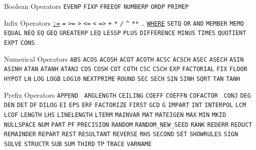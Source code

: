 \begin{list}{}
\item[Boolean Operators] {\texttt{EVENP}} {\texttt{FIXP}}
{\texttt{FREEOF}} {\texttt{NUMBERP}} {\texttt{ORDP}} {\texttt{PRIMEP}}

\item[Infix Operators]
\hyperlink{reserved:assignop}{\texttt{:=}} \verb|=| \verb|>=| \verb|>| \verb|<=| \verb|<| \verb|=>|
 \verb|+| \verb|*| \verb|/| \verb|^| \verb|**| \verb|.| 
\hyperlink{WHERE}{\texttt{WHERE}}
{\texttt{SETQ}} {\texttt{OR}} {\texttt{AND}} {\texttt{MEMBER}} {\texttt{MEMQ}} {\texttt{EQUAL}} {\texttt{NEQ}} {\texttt{EQ}} {\texttt{GEQ}} {\texttt{GREATERP}} {\texttt{LEQ}} {\texttt{LESSP}}
{\texttt{PLUS}} {\texttt{DIFFERENCE}} {\texttt{MINUS}} {\texttt{TIMES}} {\texttt{QUOTIENT}} {\texttt{EXPT}} {\texttt{CONS}}

\item[Numerical Operators] {\texttt{ABS}} {\texttt{ACOS}}
{\texttt{ACOSH}} {\texttt{ACOT}} {\texttt{ACOTH}} {\texttt{ACSC}} {\texttt{ACSCH}} {\texttt{ASEC}} {\texttt{ASECH}} {\texttt{ASIN}} {\texttt{ASINH}} {\texttt{ATAN}} {\texttt{ATANH}} {\texttt{ATAN2}} {\texttt{COS}}
{\texttt{COSH}} {\texttt{COT}} {\texttt{COTH}} {\texttt{CSC}} {\texttt{CSCH}} {\texttt{EXP}} {\texttt{FACTORIAL}} {\texttt{FIX}} {\texttt{FLOOR}} {\texttt{HYPOT}} {\texttt{LN}} {\texttt{LOG}} {\texttt{LOGB}}
{\texttt{LOG10}} {\texttt{NEXTPRIME}} {\texttt{ROUND}} {\texttt{SEC}} {\texttt{SECH}} {\texttt{SIN}}
{\texttt{SINH}} {\texttt{SQRT}} {\texttt{TAN}} {\texttt{TANH}}

\item[Prefix Operators] {\texttt{APPEND}} {\tt
ARGLENGTH} {\texttt{CEILING}} {\texttt{COEFF}} {\texttt{COEFFN}} {\texttt{COFACTOR}} {\tt
CONJ} {\texttt{DEG}} {\texttt{DEN}} {\texttt{DET}} {\texttt{DF}} {\texttt{DILOG}} {\texttt{EI}}
{\texttt{EPS}} {\texttt{ERF}} {\texttt{FACTORIZE}} {\texttt{FIRST}} {\texttt{GCD}} {\texttt{G}} {\texttt{IMPART}} {\texttt{INT}} {\texttt{INTERPOL}} {\texttt{LCM}} {\texttt{LCOF}} {\texttt{LENGTH}} {\texttt{LHS}} {\texttt{LINELENGTH}} {\texttt{LTERM}} {\texttt{MAINVAR}} {\texttt{MAT}} {\texttt{MATEIGEN}}
{\texttt{MAX}} {\texttt{MIN}} {\texttt{MKID}} {\texttt{NULLSPACE}} {\texttt{NUM}} {\texttt{PART}} {\texttt{PF}} {\texttt{PRECISION}} {\texttt{RANDOM}} {\tt RANDOM\_NEW\_SEED} {\texttt{RANK}} {\texttt{REDERR}} {\texttt{REDUCT}} {\texttt{REMAINDER}} {\texttt{REPART}} {\texttt{REST}} {\texttt{RESULTANT}} {\texttt{REVERSE}} {\texttt{RHS}} {\texttt{SECOND}} {\texttt{SET}} {\texttt{SHOWRULES}}
{\texttt{SIGN}} {\texttt{SOLVE}} {\texttt{STRUCTR}} {\texttt{SUB}} {\texttt{SUM}} {\texttt{THIRD}} {\texttt{TP}} {\texttt{TRACE}} {\texttt{VARNAME}}


\end{list}
